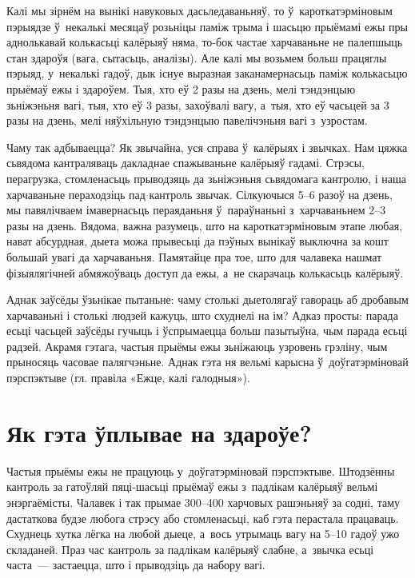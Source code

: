 Калі мы зірнём на вынікі навуковых дасьледаваньняў, то ў~кароткатэрміновым пэрыядзе ў~некалькі месяцаў розьніцы паміж трыма і шасьцю прыёмамі ежы пры аднолькавай колькасьці калёрыяў няма, то-бок частае харчаваньне не палепшыць стан здароўя (вага, сытасьць, аналізы). Але калі мы возьмем больш працяглы пэрыяд, у~некалькі гадоў, дык існуе выразная заканамернасьць паміж колькасьцю прыёмаў ежы і здароўем. Тыя, хто еў 2 разы на дзень, мелі тэндэнцыю зьніжэньня вагі, тыя, хто еў 3 разы, захоўвалі вагу, а~тыя, хто еў часьцей за 3 разы на дзень, мелі няўхільную тэндэнцыю павелічэньня вагі з~узростам.

Чаму так адбываецца? Як звычайна, уся справа ў~калёрыях і звычках. Нам цяжка сьвядома кантраляваць дакладнае спажываньне калёрыяў гадамі. Стрэсы, перагрузка, стомленасьць прыводзяць да зьніжэньня сьвядомага кантролю, і наша харчаваньне пераходзіць пад кантроль звычак. Сілкуючыся 5--6 разоў на дзень, мы павялічваем імавернасьць пераяданьня ў~параўнаньні з~харчаваньнем 2--3 разы на дзень. Вядома, важна разумець, што на кароткатэрміновым этапе любая, нават абсурдная, дыета можа прывесьці да пэўных вынікаў выключна за кошт большай увагі да харчаваньня. Памятайце пра тое, што для чалавека нашмат фізыялягічней абмяжоўваць доступ да ежы, а~не скарачаць колькасьць калёрыяў.

Аднак заўсёды ўзьнікае пытаньне: чаму столькі дыетолягаў гавораць аб дробавым харчаваньні і столькі людзей кажуць, што схуднелі на ім? Адказ просты: парада есьці часьцей заўсёды гучыць і ўспрымаецца больш пазытыўна, чым парада есьці радзей. Акрамя гэтага, частыя прыёмы ежы зьніжаюць узровень грэліну, чым прыносяць часовае палягчэньне. Аднак гэта ня вельмі карысна ў~доўгатэрміновай пэрспэктыве (гл. правіла «Ежце, калі галодныя»).

\section{Як гэта ўплывае на здароўе?}

Частыя прыёмы ежы не працуюць у~доўгатэрміновай пэрспэктыве. Штодзённы кантроль за гатоўляй пяці-шасьці прыёмаў ежы з~падлікам калёрыяў вельмі энэргаёмісты. Чалавек і так прымае 300--400 харчовых рашэньняў за содні, таму дастаткова будзе любога стрэсу або стомленасьці, каб гэта перастала працаваць. Схуднець хутка лёгка на любой дыеце, а~вось утрымаць вагу на 5--10 гадоў ужо складаней. Праз час кантроль за падлікам калёрыяў слабне, а~звычка есьці часта~--- застаецца, што і прыводзіць да набору вагі.

